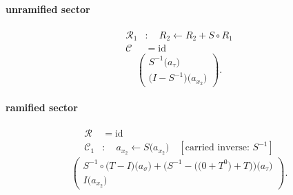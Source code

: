 \paragraph{unramified sector}
\[\begin{aligned}\mathcal R_{1}&:\quad R_2\leftarrow R_2+S\circ R_1\\\mathcal C&=\mathrm{id}\end{aligned}\]
\[\begin{pmatrix}S^{-1}\bigl(a_{\tau}\bigr)\\\bigl(I-S^{-1}\bigr)\bigl(a_{x_{2}}\bigr)\end{pmatrix}.\]
\paragraph{ramified sector}
\[\begin{aligned}\mathcal R&=\mathrm{id}\\\mathcal C_{1}&:\quad a_{x_{2}}\leftarrow S\bigl(a_{x_{2}}\bigr)\quad[\text{carried inverse: }S^{-1}]\end{aligned}\]
\[\begin{pmatrix}S^{-1}\circ \bigl(T-I\bigr)\bigl(a_{\sigma}\bigr)+\bigl(S^{-1}-\bigl(\bigl(0+T^{0}\bigr)+T\bigr)\bigr)\bigl(a_{\tau}\bigr)\\I\bigl(a_{x_{2}}\bigr)\end{pmatrix}.\]
